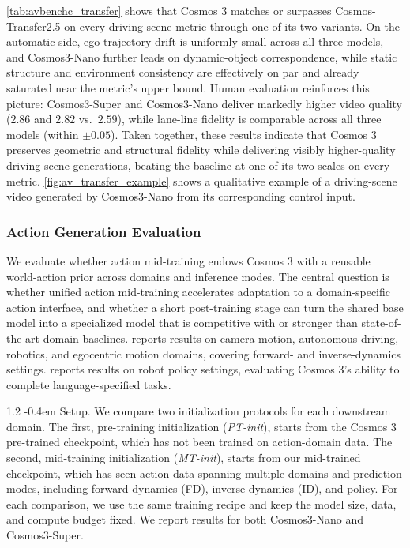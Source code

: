 \documentclass{llmxive}
\makeatletter
\providecommand{\paragraph}{  \@startsection{paragraph}{4}{\z@}    {1\baselineskip \@plus .2\baselineskip}    {-0.4em}    {\normalfont\normalsize\bfseries}}
\makeatother
\begin{document}
\cref{tab:avbenchc_transfer} shows that Cosmos 3 matches or surpasses Cosmos-Transfer2.5 on every driving-scene metric through one of its two variants. On the automatic side, ego-trajectory drift is uniformly small across all three models, and Cosmos3-Nano further leads on dynamic-object correspondence, while static structure and environment consistency are effectively on par and already saturated near the metric's upper bound. Human evaluation reinforces this picture: Cosmos3-Super and Cosmos3-Nano deliver markedly higher video quality ($2.86$ and $2.82$ vs.\ $2.59$), while lane-line fidelity is comparable across all three models (within $\pm 0.05$). Taken together, these results indicate that Cosmos 3 preserves geometric and structural fidelity while delivering visibly higher-quality driving-scene generations, beating the baseline at one of its two scales on every metric. \cref{fig:av_transfer_example} shows a qualitative example of a driving-scene video generated by Cosmos3-Nano from its corresponding control input.

\FloatBarrier
\subsubsection{Action Generation Evaluation}
\label{subsec::action_benchmarks}

We evaluate whether action mid-training endows Cosmos 3 with a reusable world-action prior across domains and inference modes.
The central question is whether unified action mid-training accelerates adaptation to a domain-specific action interface, and whether a short post-training stage can turn the shared base model into a specialized model that is competitive with or stronger than state-of-the-art domain baselines.
 reports results on camera motion, autonomous driving, robotics, and egocentric motion domains, covering forward- and inverse-dynamics settings.
 reports results on robot policy settings, evaluating Cosmos 3's ability to complete language-specified tasks.

\paragraph{Setup.} We compare two initialization protocols for each downstream domain. The first, pre-training initialization (\textit{PT-init}), starts from the Cosmos 3 pre-trained checkpoint, which has not been trained on action-domain data. The second, mid-training initialization (\textit{MT-init}), starts from our mid-trained checkpoint, which has seen action data spanning multiple domains and prediction modes, including forward dynamics (FD), inverse dynamics (ID), and policy. For each comparison, we use the same training recipe and keep the model size, data, and compute budget fixed. We report results for both Cosmos3-Nano and Cosmos3-Super.
\end{document}
